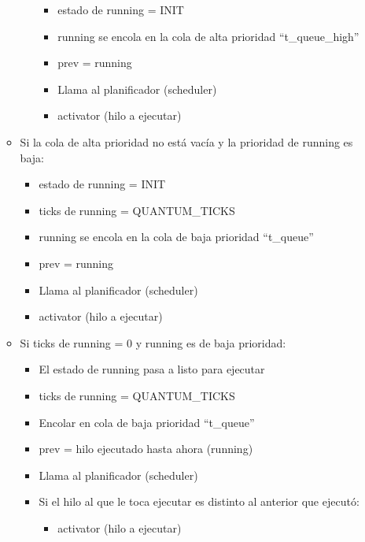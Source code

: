 \documentclass[10pt, spanish, pdftex]{template/UC3M_document}
\begin{document}
\begin{itemize}
\begin{itemize}
\begin{itemize}
            \vspace{-2mm}
    \begin{itemize}
     \setlength{\itemsep}{-1.5mm}
                \item estado de running = INIT
                \item running se encola en la cola de alta prioridad “t\_queue\_high”
                \item prev = running
                \item Llama al planificador (scheduler)
                \item activator (hilo a ejecutar)
            \end{itemize}
        \end{itemize}
        \item Si la cola de alta prioridad no está vacía y la prioridad de running es baja:
        \vspace{-2mm}
    \begin{itemize}
     \setlength{\itemsep}{-1.5mm}
            \item estado de running = INIT
            \item ticks de running = QUANTUM\_TICKS
            \item running se encola en la cola de baja prioridad “t\_queue”
            \item prev = running
            \item Llama al planificador (scheduler)
            \item activator (hilo a ejecutar)
        \end{itemize}
        \item Si ticks de running = 0 y running es de baja prioridad:
        \vspace{-2mm}
    \begin{itemize}
     \setlength{\itemsep}{-1.5mm}
            \item El estado de running pasa a listo para ejecutar
            \item ticks de running = QUANTUM\_TICKS
            \item Encolar en cola de baja prioridad “t\_queue”
            \item prev = hilo ejecutado hasta ahora (running)
            \item Llama al planificador (scheduler)
            \item Si el hilo al que le toca ejecutar es distinto al anterior que ejecutó:
            \vspace{-2mm}
    \begin{itemize}
     \setlength{\itemsep}{-1.5mm}
                \item activator (hilo a ejecutar)
            \end{itemize}
        \end{itemize}
    \end{itemize}
\end{itemize}
\end{document}
